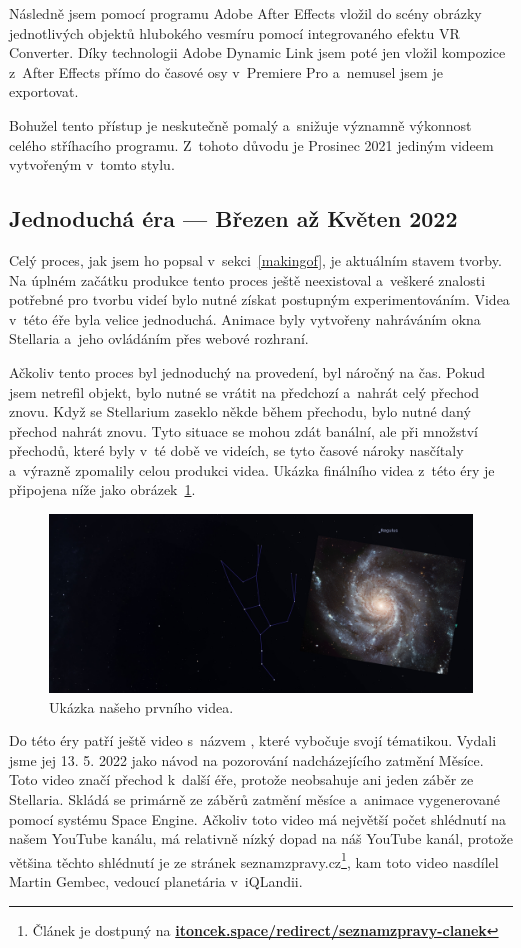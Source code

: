 \documentclass[12pt,a4paper,titlepage]{article}
\newcommand{\link}[2]{\href{#1}{\textcolor{link-color}{\textbf{#2}}}}%
\begin{document}
Následně jsem pomocí programu Adobe After Effects vložil do scény obrázky jednotlivých objektů hlubokého vesmíru pomocí integrovaného efektu VR Converter. Díky technologii Adobe Dynamic Link jsem poté jen vložil kompozice z~After Effects přímo do časové osy v~Premiere Pro a~nemusel jsem je exportovat. 

Bohužel tento přístup je neskutečně pomalý a~snižuje významně výkonnost celého stříhacího programu. Z~tohoto důvodu je Prosinec 2021 jediným videem vytvořeným v~tomto stylu.

\subsection{Jednoduchá éra --- Březen až Květen 2022}
Celý proces, jak jsem ho popsal v~sekci~\ref{makingof}, je aktuálním stavem tvorby. Na úplném začátku produkce tento proces ještě neexistoval a~veškeré znalosti potřebné pro tvorbu  videí bylo nutné získat postupným experimentováním. Videa v~této éře byla velice jednoduchá. Animace byly vytvořeny nahráváním okna Stellaria a~jeho ovládáním přes webové rozhraní.

Ačkoliv tento proces byl jednoduchý na provedení, byl náročný na čas. Pokud jsem netrefil objekt, bylo nutné se vrátit na předchozí a~nahrát celý přechod znovu. Když se Stellarium zaseklo někde během přechodu, bylo nutné daný přechod nahrát znovu. Tyto situace se mohou zdát banální, ale při množství přechodů, které byly v~té době ve videích, se tyto časové nároky nasčítaly a~výrazně zpomalily celou produkci videa. Ukázka finálního videa z~této éry je připojena níže jako obrázek~\ref{img:brezen}.

\begin{figure}[H]
	\centering
	\includegraphics[width=.85\textwidth]{brezen.png}
	\caption{Ukázka našeho prvního videa.}\label{img:brezen}
\end{figure}

Do této éry patří ještě video s~názvem , které vybočuje svojí tématikou. Vydali jsme jej 13. 5. 2022 jako návod na pozorování nadcházejícího zatmění Měsíce. Toto video značí přechod k~další éře, protože neobsahuje ani jeden záběr ze Stellaria. Skládá se primárně ze záběrů zatmění měsíce a~animace vygenerované pomocí systému Space Engine. Ačkoliv toto video má největší počet shlédnutí na našem YouTube kanálu, má relativně nízký dopad na náš YouTube kanál, protože většina těchto shlédnutí je ze stránek seznam\-zpravy.cz\footnote{Článek je dostpuný na \link{https://mp.itoncek.space/redirect/seznamzpravy-clanek}{itoncek.space/redirect/seznamzpravy-clanek}}, kam toto video nasdílel Martin Gembec, vedoucí planetária v~iQLandii.
\end{document}

